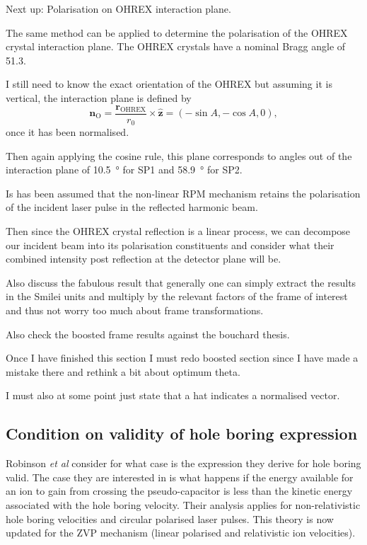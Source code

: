 Next up: Polarisation on OHREX interaction plane.

The same method can be applied to determine the polarisation of the OHREX crystal interaction plane. The OHREX crystals have a nominal Bragg angle of 51.3\degree.

I still need to know the exact orientation of the OHREX but assuming it is vertical, the interaction plane is defined by
\begin{equation}
	\mathbf{n}_\mathrm{O} =  \frac{\mathbf{r}_\mathrm{OHREX}}{r_0} \times \hat{\mathbf{z}}= (-\sin A, -\cos A, 0),
\end{equation}
once it has been normalised.

Then again applying the cosine rule, this plane corresponds to angles out of the interaction plane of \qty{10.5}{\degree} for SP1 and \qty{58.9}{\degree} for SP2.

Is has been assumed that the non-linear RPM mechanism retains the polarisation of the incident laser pulse in the reflected harmonic beam.

Then since the OHREX crystal reflection is a linear process, we can decompose our incident beam into its polarisation constituents and consider what their combined intensity post reflection at the detector plane will be.

Also discuss the fabulous result that generally one can simply extract the results in the Smilei units and multiply by the relevant factors of the frame of interest and thus not worry too much about frame transformations.

Also check the boosted frame results against the bouchard thesis.


Once I have finished this section I must redo boosted section since I have made a mistake there and rethink a bit about optimum theta.

I must also at some point just state that a hat indicates a normalised vector.



\subsection{Condition on validity of hole boring expression}
Robinson \textit{et al} \cite{robinsonHoleboringRadiationPressure2009} consider for what case is the expression they derive for hole boring valid. The case they are interested in is what happens if the energy available for an ion to gain from crossing the pseudo-capacitor is less than the kinetic energy associated with the hole boring velocity. Their analysis applies for non-relativistic hole boring velocities and circular polarised laser pulses. This theory is now updated for the ZVP mechanism (linear polarised and relativistic ion velocities).

